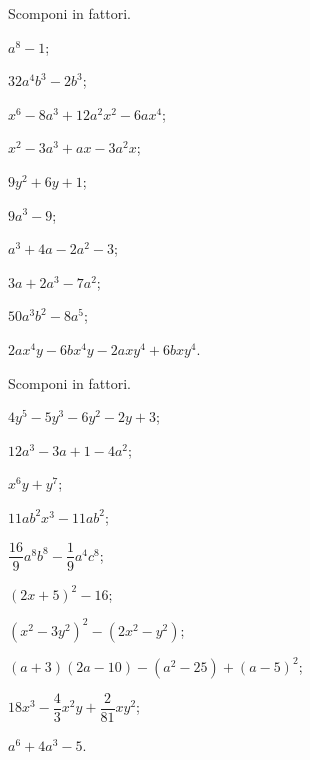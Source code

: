 \begin{esercizio}
 \label{ese:13.127}
 Scomponi in fattori.
\begin{multicols}{2}
 \begin{enumeratea}
\item $a^{{8}}-1$;
\item $32a^{4}b^{3} - 2b^{3}$;
\item $x^{6} - 8a^{3} + 12a^{2}x^{2} - 6ax^{4}$;
\item $x^{2} - 3a^{3} + ax - 3a^{2}x$;
\item $9y^{2}+6y+1$;
\item $9a^{3}-9$;
\item $a^{3}+4a-2a^{2}-3$;
\item $3a+2a^{3}-7a^{2}$;
\item $50a^{3}b^{2}-8a^{5}$;
\item $2ax^{4}y-6bx^{4}y-2axy^{4}+6bxy^{4}$.
 \end{enumeratea}
\end{multicols}
\end{esercizio}

\begin{esercizio}[\Ast]
 \label{ese:13.128}
 Scomponi in fattori.
 \begin{multicols}{2}
 \begin{enumeratea}
\item $4y^{5}-5y^{3}-6y^{2}-2y+3$;
\item $12a^{3}-3a+1-4a^{2}$;
\item $x^{6}y+y^{7}$;
\item $11ab^{2}x^{3}-11ab^{2}$;
\item $\dfrac{16}{9}a^{8}b^{8}-\dfrac{1}{9}a^{4}c^{8}$;
\item $(2x+5)^{2}-16$;
\item $\left(x^{2}-3y^{2}\right)^{2}-\left(2x^{2}-y^{2}\right)$;
\item $(a+3)(2a-10)-\left(a^{2}-25\right)+(a-5)^2$;
\item $18x^{3}-\dfrac{4}{3}x^{2}y+\dfrac{2}{81}xy^{2}$;
\item $a^{6}+4a^{3}-5$.
 \end{enumeratea}
 \end{multicols}
\end{esercizio}

